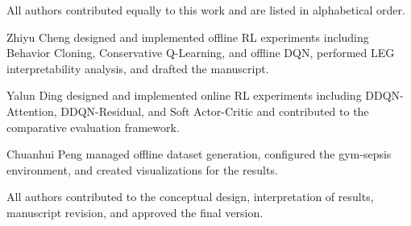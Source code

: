 
All authors contributed equally to this work and are listed in alphabetical order.

Zhiyu Cheng designed and implemented offline RL experiments including Behavior Cloning, Conservative Q-Learning, and offline DQN, performed LEG interpretability analysis, and drafted the manuscript.

Yalun Ding designed and implemented online RL experiments including DDQN-Attention, DDQN-Residual, and Soft Actor-Critic and contributed to the comparative evaluation framework.

Chuanhui Peng managed offline dataset generation, configured the gym-sepsis environment, and created visualizations for the results.

All authors contributed to the conceptual design, interpretation of results, manuscript revision, and approved the final version.
